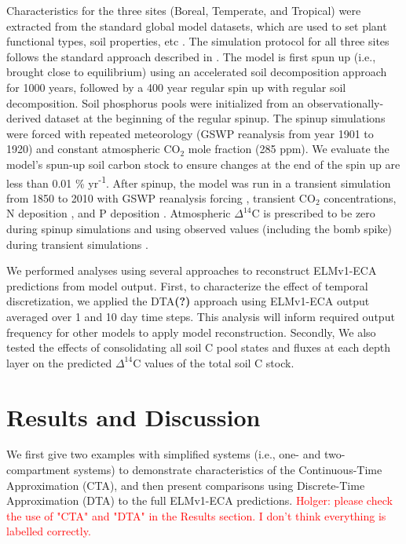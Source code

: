 \documentclass[11pt,a4paper]{article}
\newcommand{\red}[1]{\textcolor{red}{#1}}
\begin{document}
    Characteristics for the three sites (Boreal, Temperate, and Tropical) were extracted from the standard global model datasets, which are used to set plant functional types, soil properties, etc \citep{Zhu2019}. The simulation protocol for all three sites follows the standard approach described in \citet{Oleson2010}. The model is first spun up (i.e., brought close to equilibrium) using an accelerated soil decomposition approach \citep{Koven2013} for 1000 years, followed by a 400 year regular spin up with regular soil decomposition. Soil phosphorus pools were initialized from an observationally-derived dataset \citep{Yang2013} at the beginning of the regular spinup. The spinup simulations were forced with repeated meteorology (GSWP reanalysis \citep{Dirmeyer2006} from year 1901 to 1920) and constant atmospheric CO$_2$ mole fraction (285 ppm). We evaluate the model's spun-up soil carbon stock to ensure changes at the end of the spin up are less than 0.01 \% yr\textsuperscript{-1}. After spinup, the model was run in a transient simulation from 1850 to 2010 with GSWP reanalysis forcing \citep{Dirmeyer2006}, transient CO$_2$ concentrations, N deposition \citep{Lamarque2005}, and P deposition \citep{Mahowald2008}. Atmospheric   $\Delta^{14}$C  is prescribed to be zero during spinup simulations and using observed values (including the bomb spike) during transient simulations \citep{Levin2010}.
    
    We performed analyses using several approaches to reconstruct ELMv1-ECA predictions from model output. First, to characterize the effect of temporal discretization, we applied the DTA\textbf{(?)} approach using ELMv1-ECA output averaged over 1 and 10 day time steps. This analysis will inform required output frequency for other models to apply model reconstruction. Secondly, We also tested the effects of consolidating all soil C pool states and fluxes at each depth layer on the predicted $\Delta^{14}$C values of the total soil C stock. 

\section{Results and Discussion}
We first give two examples with simplified systems (i.e., one- and two-compartment systems) to demonstrate characteristics of the Continuous-Time Approximation (CTA), and then present comparisons using Discrete-Time Approximation (DTA) to the full ELMv1-ECA predictions. \red{Holger: please check the use of "CTA" and "DTA" in the Results section. I don't think everything is labelled correctly.}
\end{document}
